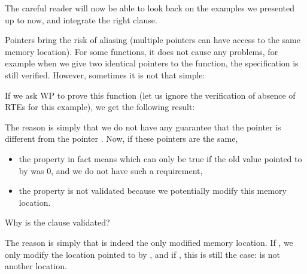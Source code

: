


The careful reader will now be able to look back on the examples we
presented up to now, and integrate the right  clause.





Pointers bring the risk of aliasing (multiple pointers can have access
to the same memory location). For some functions, it does not cause any
problems, for example when we give two identical pointers to the
 function, the specification is still verified. However,
sometimes it is not that simple:






If we ask WP to prove this function (let us ignore the verification of absence
of RTEs for this example), we get the following result:





The reason is simply that we do not have any guarantee that the pointer
 is different from the pointer . Now, if these
pointers are the same,



\begin{itemize}
\item   the property  in fact
  means  which can only
  be true if the old value pointed to by  was $0$, and we do
  not have such a requirement,
\item
  the property  is not validated
  because we potentially modify this memory location.
\end{itemize}


\begin{Question}
  Why is the  clause validated?

  The reason is simply that  is indeed the only modified memory
  location. If , we only modify the location
  pointed to by
  , and if , this is still the case:
   is not another location.
\end{Question}


